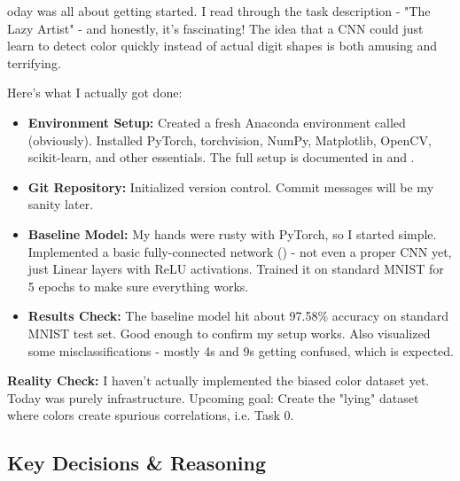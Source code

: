 \documentclass[9pt,a4paper,twocolumn,twoside]{tau-class/tau}
\begin{document}
        oday was all about getting started. I read through the task description - "The Lazy Artist" - and honestly, it's fascinating! The idea that a CNN could just learn to detect color quickly instead of actual digit shapes is both amusing and terrifying.
        
        Here's what I actually got done:
        
        \begin{itemize}
            \item \textbf{Environment Setup:} Created a fresh Anaconda environment called  (obviously). Installed PyTorch, torchvision, NumPy, Matplotlib, OpenCV, scikit-learn, and other essentials. The full setup is documented in  and .
            
            \item \textbf{Git Repository:} Initialized version control. Commit messages will be my sanity later.
            
            \item \textbf{Baseline Model:} My hands were rusty with PyTorch, so I started simple. Implemented a basic fully-connected network () - not even a proper CNN yet, just Linear layers with ReLU activations. Trained it on standard MNIST for 5 epochs to make sure everything works.
            
            \item \textbf{Results Check:} The baseline model hit about 97.58\% accuracy on standard MNIST test set. Good enough to confirm my setup works. Also visualized some misclassifications - mostly 4s and 9s getting confused, which is expected.
        \end{itemize}
        
        \begin{note}
            \textbf{Reality Check:} I haven't actually implemented the biased color dataset yet. Today was purely infrastructure. Upcoming goal: Create the "lying" dataset where colors create spurious correlations, i.e. Task 0.
        \end{note}
        
    \subsection{Key Decisions \& Reasoning}
    
\end{document}
